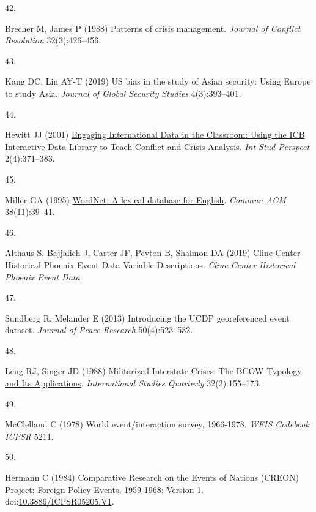 \documentclass[9pt,twocolumn,twoside,lineno]{pnas-new}
\newlength{\cslhangindent}
\newlength{\csllabelwidth}
\newlength{\cslentryspacingunit} %
\newenvironment{CSLReferences}[2] %
 {%
  \setlength{\parindent}{0pt}
  \ifodd #1
  \let\oldpar\par
  \def\par{\hangindent=\cslhangindent\oldpar}
  \fi
  \setlength{\parskip}{#2\cslentryspacingunit}
 }%
 {}
\newcommand{\CSLLeftMargin}[1]{\parbox[t]{\csllabelwidth}{#1}}
\newcommand{\CSLRightInline}[1]{\parbox[t]{\linewidth - \csllabelwidth}{#1}\break}
\begin{document}
\begin{CSLReferences}{0}{0}
\leavevmode{}%
\CSLLeftMargin{42. }%
\CSLRightInline{Brecher M, James P (1988) Patterns of crisis management.
\emph{Journal of Conflict Resolution} 32(3):426--456.}

\leavevmode{}%
\CSLLeftMargin{43. }%
\CSLRightInline{Kang DC, Lin AY-T (2019) {US} bias in the study of
{Asian} security: {Using Europe} to study {Asia}. \emph{Journal of
Global Security Studies} 4(3):393--401.}

\leavevmode{}%
\CSLLeftMargin{44. }%
\CSLRightInline{Hewitt JJ (2001)
\href{https://doi.org/10.1111/1528-3577.00066}{Engaging {International
Data} in the {Classroom}: {Using} the {ICB Interactive Data Library} to
{Teach Conflict} and {Crisis Analysis}}. \emph{Int Stud Perspect}
2(4):371--383.}

\leavevmode{}%
\CSLLeftMargin{45. }%
\CSLRightInline{Miller GA (1995)
\href{https://doi.org/10.1145/219717.219748}{{WordNet}: A lexical
database for {English}}. \emph{Commun ACM} 38(11):39--41.}

\leavevmode{}%
\CSLLeftMargin{46. }%
\CSLRightInline{Althaus S, Bajjalieh J, Carter JF, Peyton B, Shalmon DA
(2019) Cline {Center Historical Phoenix Event Data Variable
Descriptions}. \emph{Cline Center Historical Phoenix Event Data}.}

\leavevmode{}%
\CSLLeftMargin{47. }%
\CSLRightInline{Sundberg R, Melander E (2013) Introducing the {UCDP}
georeferenced event dataset. \emph{Journal of Peace Research}
50(4):523--532.}

\leavevmode{}%
\CSLLeftMargin{48. }%
\CSLRightInline{Leng RJ, Singer JD (1988)
\href{https://doi.org/10.2307/2600625}{Militarized {Interstate Crises}:
{The BCOW Typology} and {Its Applications}}. \emph{International Studies
Quarterly} 32(2):155--173.}

\leavevmode{}%
\CSLLeftMargin{49. }%
\CSLRightInline{McClelland C (1978) World event/interaction survey,
1966-1978. \emph{WEIS Codebook ICPSR} 5211.}

\leavevmode{}%
\CSLLeftMargin{50. }%
\CSLRightInline{Hermann C (1984) Comparative {Research} on the {Events}
of {Nations} ({CREON}) {Project}: {Foreign Policy Events}, 1959-1968:
{Version} 1.
doi:\href{https://doi.org/10.3886/ICPSR05205.V1}{10.3886/ICPSR05205.V1}.}


\end{CSLReferences}
\end{document}
